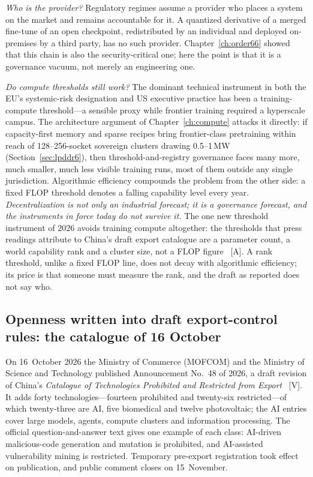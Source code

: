\emph{Who is the provider?} Regulatory regimes assume a provider who places a system on the market and remains accountable for it. A quantized derivative of a merged fine-tune of an open checkpoint, redistributed by an individual and deployed on-premises by a third party, has no such provider. Chapter~\ref{ch:order66} showed that this chain is also the security-critical one; here the point is that it is a governance vacuum, not merely an engineering one.

\emph{Do compute thresholds still work?} The dominant technical instrument in both the EU's systemic-risk designation and US executive practice has been a training-compute threshold---a sensible proxy while frontier training required a hyperscale campus. The architecture argument of Chapter~\ref{ch:compute} attacks it directly: if capacity-first memory and sparse recipes bring frontier-class pretraining within reach of 128--256-socket sovereign clusters drawing 0.5--1\,MW (Section~\ref{sec:lpddr6}), then threshold-and-registry governance faces many more, much smaller, much less visible training runs, most of them outside any single jurisdiction. Algorithmic efficiency compounds the problem from the other side: a fixed FLOP threshold denotes a falling capability level every year. \emph{Decentralization is not only an industrial forecast; it is a governance forecast, and the instruments in force today do not survive it.} The one new threshold instrument of 2026 avoids training compute altogether: the thresholds that press readings attribute to China's draft export catalogue are a parameter count, a world capability rank and a cluster size, not a FLOP figure~\cite{gov-catalogue-thresholds} [A]. A rank threshold, unlike a fixed FLOP line, does not decay with algorithmic efficiency; its price is that someone must measure the rank, and the draft as reported does not say who.

\subsection{Openness written into draft export-control rules: the catalogue of 16 October}
\label{sec:gov-export-catalogue}

On 16~October 2026 the Ministry of Commerce (MOFCOM) and the Ministry of Science and Technology published Announcement No.~48 of 2026, a draft revision of China's \emph{Catalogue of Technologies Prohibited and Restricted from Export}~\cite{gov-mofcom-catalogue} [V]. It adds forty technologies---fourteen prohibited and twenty-six restricted---of which twenty-three are AI, five biomedical and twelve photovoltaic; the AI entries cover large models, agents, compute clusters and information processing. The official question-and-answer text gives one example of each class: AI-driven malicious-code generation and mutation is prohibited, and AI-assisted vulnerability mining is restricted. Temporary pre-export registration took effect on publication, and public comment closes on 15~November.

